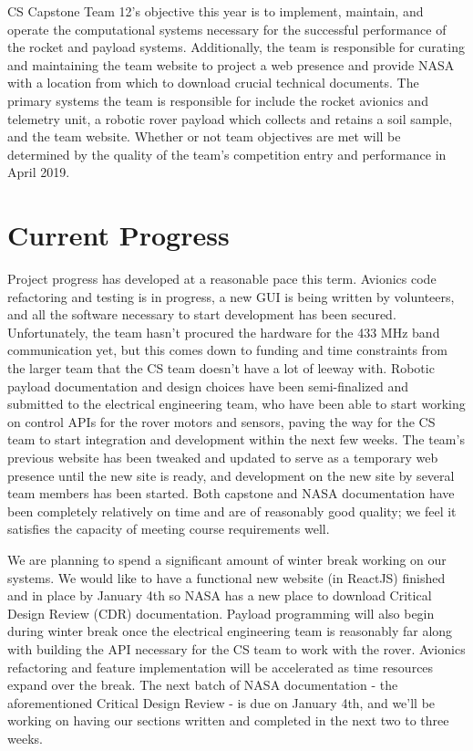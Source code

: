 \documentclass[journal,10pt,draftclsnofoot,onecolumn,compsoc]{IEEEtran} \usepackage[margin=0.75in]{geometry}
\begin{document}
\noindent CS Capstone Team 12's objective this year is to implement, maintain, and operate the computational systems necessary for the successful performance of the rocket and payload systems. Additionally, the team is responsible for curating and maintaining the team website to project a web presence and provide NASA with a location from which to download crucial technical documents. The primary systems the team is responsible for include the rocket avionics and telemetry unit, a robotic rover payload which collects and retains a soil sample, and the team website. Whether or not team objectives are met will be determined by the quality of the team's competition entry and performance in April 2019.

\section{Current Progress}
Project progress has developed at a reasonable pace this term. Avionics code refactoring and testing is in progress, a new GUI is being written by volunteers, and all the software necessary to start development has been secured. Unfortunately, the team hasn't procured the hardware for the 433 MHz band communication yet, but this comes down to funding and time constraints from the larger team that the CS team doesn't have a lot of leeway with. Robotic payload documentation and design choices have been semi-finalized and submitted to the electrical engineering team, who have been able to start working on control APIs for the rover motors and sensors, paving the way for the CS team to start integration and development within the next few weeks. The team's previous website has been tweaked and updated to serve as a temporary web presence until the new site is ready, and development on the new site by several team members has been started. Both capstone and NASA documentation have been completely relatively on time and are of reasonably good quality; we feel it satisfies the capacity of meeting course requirements well.\newline

\noindent We are planning to spend a significant amount of winter break working on our systems. We would like to have a functional new website (in ReactJS) finished and in place by January 4th so NASA has a new place to download Critical Design Review (CDR) documentation. Payload programming will also begin during winter break once the electrical engineering team is reasonably far along with building the API necessary for the CS team to work with the rover. Avionics refactoring and feature implementation will be accelerated as time resources expand over the break. The next batch of NASA documentation - the aforementioned Critical Design Review - is due on January 4th, and we'll be working on having our sections written and completed in the next two to three weeks.
\end{document}
